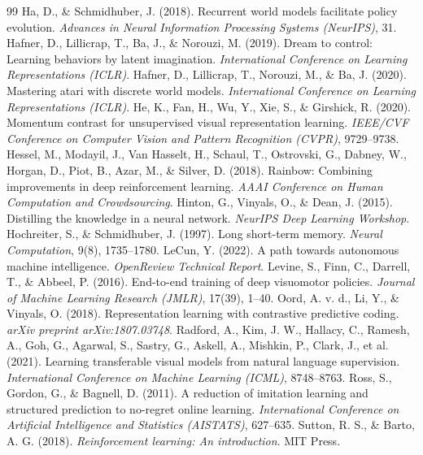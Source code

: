 \documentclass[11pt,a4paper]{article}
\begin{document}
\begin{thebibliography}{99}
 Ha, D., \& Schmidhuber, J. (2018). Recurrent world models facilitate policy evolution. \textit{Advances in Neural Information Processing Systems (NeurIPS)}, 31.
 Hafner, D., Lillicrap, T., Ba, J., \& Norouzi, M. (2019). Dream to control: Learning behaviors by latent imagination. \textit{International Conference on Learning Representations (ICLR)}.
 Hafner, D., Lillicrap, T., Norouzi, M., \& Ba, J. (2020). Mastering atari with discrete world models. \textit{International Conference on Learning Representations (ICLR)}.
 He, K., Fan, H., Wu, Y., Xie, S., \& Girshick, R. (2020). Momentum contrast for unsupervised visual representation learning. \textit{IEEE/CVF Conference on Computer Vision and Pattern Recognition (CVPR)}, 9729--9738.
 Hessel, M., Modayil, J., Van Hasselt, H., Schaul, T., Ostrovski, G., Dabney, W., Horgan, D., Piot, B., Azar, M., \& Silver, D. (2018). Rainbow: Combining improvements in deep reinforcement learning. \textit{AAAI Conference on Human Computation and Crowdsourcing}.
 Hinton, G., Vinyals, O., \& Dean, J. (2015). Distilling the knowledge in a neural network. \textit{NeurIPS Deep Learning Workshop}.
 Hochreiter, S., \& Schmidhuber, J. (1997). Long short-term memory. \textit{Neural Computation}, 9(8), 1735--1780.
 LeCun, Y. (2022). A path towards autonomous machine intelligence. \textit{OpenReview Technical Report}.
 Levine, S., Finn, C., Darrell, T., \& Abbeel, P. (2016). End-to-end training of deep visuomotor policies. \textit{Journal of Machine Learning Research (JMLR)}, 17(39), 1--40.
 Oord, A. v. d., Li, Y., \& Vinyals, O. (2018). Representation learning with contrastive predictive coding. \textit{arXiv preprint arXiv:1807.03748}.
 Radford, A., Kim, J. W., Hallacy, C., Ramesh, A., Goh, G., Agarwal, S., Sastry, G., Askell, A., Mishkin, P., Clark, J., et al. (2021). Learning transferable visual models from natural language supervision. \textit{International Conference on Machine Learning (ICML)}, 8748--8763.
 Ross, S., Gordon, G., \& Bagnell, D. (2011). A reduction of imitation learning and structured prediction to no-regret online learning. \textit{International Conference on Artificial Intelligence and Statistics (AISTATS)}, 627--635.
 Sutton, R. S., \& Barto, A. G. (2018). \textit{Reinforcement learning: An introduction}. MIT Press.

\end{thebibliography}
\end{document}
